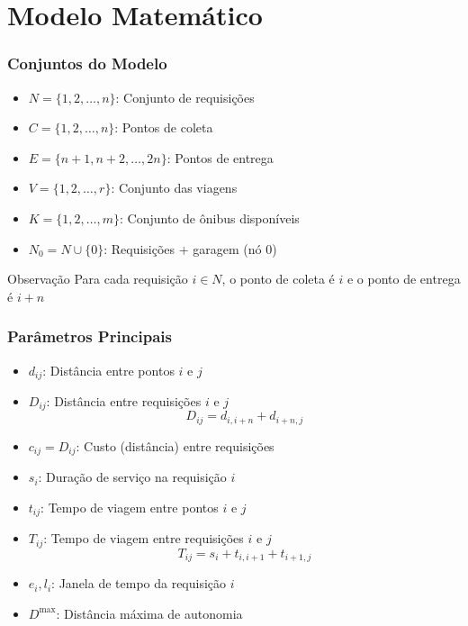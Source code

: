 \documentclass[10pt]{beamer}
\begin{document}
\section{Modelo Matemático}

\begin{frame}
\frametitle{Conjuntos do Modelo}
\begin{itemize}
    \item $N = \{1, 2, \dots, n\}$: Conjunto de requisições
    \item $C = \{1, 2, \dots, n\}$: Pontos de coleta
    \item $E = \{n+1, n+2, \dots, 2n\}$: Pontos de entrega
    \item $V = \{1, 2, \dots, r\}$: Conjunto das viagens
    \item $K = \{1, 2, \dots, m\}$: Conjunto de ônibus disponíveis
    \item $N_0 = N \cup \{0\}$: Requisições + garagem (nó 0)
\end{itemize}

\vspace{0.5cm}
\begin{alertblock}{Observação}
Para cada requisição $i \in N$, o ponto de coleta é $i$ e o ponto de entrega é $i+n$
\end{alertblock}
\end{frame}

\begin{frame}
\frametitle{Parâmetros Principais}
\begin{itemize}
    \item $d_{ij}$: Distância entre pontos $i$ e $j$
    \item $D_{ij}$: Distância entre requisições $i$ e $j$
    \begin{equation*}
    D_{ij} = d_{i, i+n} + d_{i+n, j}
    \end{equation*}
    \item $c_{ij} = D_{ij}$: Custo (distância) entre requisições
    \item $s_i$: Duração de serviço na requisição $i$
    \item $t_{ij}$: Tempo de viagem entre pontos $i$ e $j$
    \item $T_{ij}$: Tempo de viagem entre requisições $i$ e $j$
    \begin{equation*}
        T_{ij} =  s_i + t_{i,i+1} + t_{i+1,j}
    \end{equation*}
    \item $e_i, l_i$: Janela de tempo da requisição $i$
    \item $D^{\max}$: Distância máxima de autonomia
\end{itemize}
\end{frame}
\end{document}
